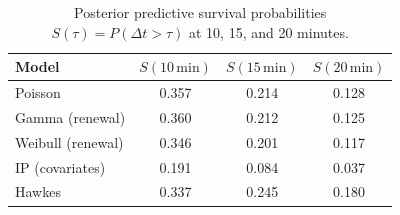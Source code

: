 \begin{table}
\caption{Posterior predictive survival probabilities $S(\tau)=P(\Delta t>\tau)$ at 10, 15, and 20 minutes.}
\label{tab:exceedance}
\begin{tabular}{lccc}
\toprule
Model & $S(10\,\text{min})$ & $S(15\,\text{min})$ & $S(20\,\text{min})$ \\
\midrule
Poisson & 0.357 & 0.214 & 0.128 \\
Gamma (renewal) & 0.360 & 0.212 & 0.125 \\
Weibull (renewal) & 0.346 & 0.201 & 0.117 \\
IP (covariates) & 0.191 & 0.084 & 0.037 \\
Hawkes & 0.337 & 0.245 & 0.180 \\
\bottomrule
\end{tabular}
\end{table}
